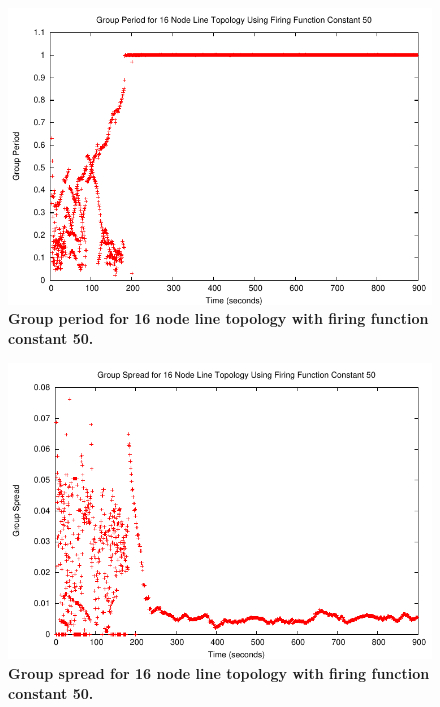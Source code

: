 \begin{figure}[t]
\begin{center}
\includegraphics[width=1.0\hsize]{./figures/5-Jan-2005-1-LINE-NODES-16-50CONSTANT-GROUP-PERIOD.pdf}
\end{center}
\caption{{\small {\bf Group period for 16 node line topology with firing function constant 50.} }}
\label{fig:lgp}
\end{figure}

\begin{figure}[t]
\begin{center}
\includegraphics[width=1.0\hsize]{./figures/5-Jan-2005-1-LINE-NODES-16-50CONSTANT-GROUP-SPREAD.pdf}
\end{center}
\caption{{\small {\bf Group spread for 16 node line topology with firing function constant 50.} }}
\label{fig:lgs}
\end{figure}

